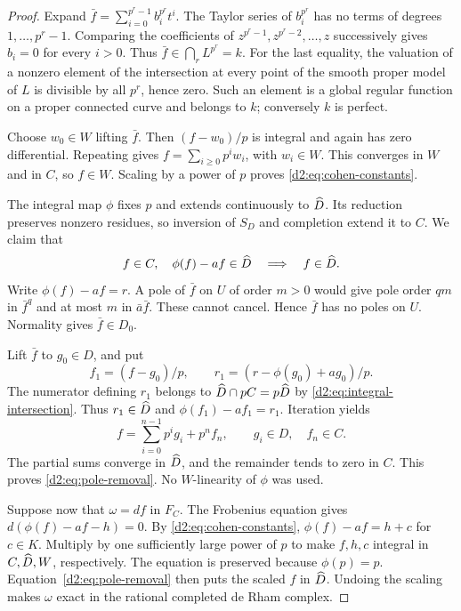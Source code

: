 \begin{proof}
Expand \(\bar f=\sum_{i=0}^{p^r-1}b_i^{p^r}t^i\).
The Taylor series of \(b_i^{p^r}\) has no terms of degrees
\(1,\ldots,p^r-1\).
Comparing the coefficients of \(z^{p^r-1},z^{p^r-2},\ldots,z\)
successively gives \(b_i=0\) for every \(i>0\).
Thus \(\bar f\in\bigcap_rL^{p^r}=k\).
For the last equality, the valuation of a nonzero element of the
intersection at every point of the smooth proper model of \(L\) is
divisible by all \(p^r\), hence zero.
Such an element is a global regular function on a proper connected
curve and belongs to \(k\); conversely \(k\) is perfect.

Choose \(w_0\in W\) lifting \(\bar f\).
Then \((f-w_0)/p\) is integral and again has zero differential.
Repeating gives \(f=\sum_{i\ge0}p^iw_i\), with \(w_i\in W\).
This converges in \(W\) and in \(C\), so \(f\in W\).
Scaling by a power of \(p\) proves \eqref{d2:eq:cohen-constants}.

The integral map \(\phi\) fixes \(p\) and extends continuously to
\(\widehat D\). Its reduction preserves nonzero residues, so inversion
of \(S_D\) and completion extend it to \(C\).
We claim that
\begin{equation}\label{d2:eq:pole-removal}
 f\in C,\quad \phi(f)-af\in\widehat D
 \quad\Longrightarrow\quad f\in\widehat D.
\end{equation}
Write \(\phi(f)-af=r\).
A pole of \(\bar f\) on \(U\) of order \(m>0\) would give pole
order \(qm\) in \(\bar f^q\) and at most \(m\) in
\(\bar a\bar f\). These cannot cancel.
Hence \(\bar f\) has no poles on \(U\).
Normality gives \(\bar f\in D_0\).

Lift \(\bar f\) to \(g_0\in D\), and put
\[
 f_1=(f-g_0)/p,\qquad
 r_1=(r-\phi(g_0)+ag_0)/p.
\]
The numerator defining \(r_1\) belongs to
\(\widehat D\cap pC=p\widehat D\) by \eqref{d2:eq:integral-intersection}.
Thus \(r_1\in\widehat D\) and \(\phi(f_1)-af_1=r_1\).
Iteration yields
\[
 f=\sum_{i=0}^{n-1}p^ig_i+p^nf_n,
 \qquad g_i\in D,\quad f_n\in C.
\]
The partial sums converge in \(\widehat D\), and the remainder tends to
zero in \(C\). This proves \eqref{d2:eq:pole-removal}.
No \(W\)-linearity of \(\phi\) was used.

Suppose now that \(\omega=df\) in \(F_C\).
The Frobenius equation gives
\(d(\phi(f)-af-h)=0\).
By \eqref{d2:eq:cohen-constants},
\(\phi(f)-af=h+c\) for \(c\in K\).
Multiply by one sufficiently large power of \(p\) to make
\(f,h,c\) integral in \(C,\widehat D,W\), respectively.
The equation is preserved because \(\phi(p)=p\).
Equation~\eqref{d2:eq:pole-removal} then puts the scaled \(f\) in
\(\widehat D\). Undoing the scaling makes \(\omega\) exact in the
rational completed de Rham complex.


\end{proof}
